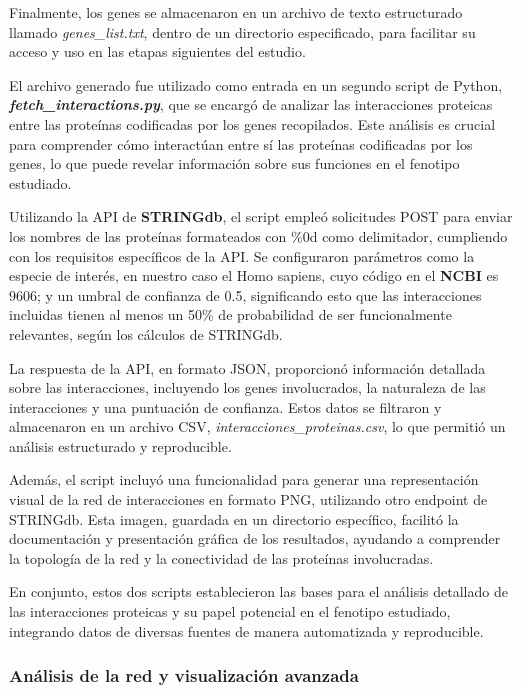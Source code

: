 Finalmente, los genes se almacenaron en un archivo de texto estructurado llamado \textit{genes\_list.txt}, dentro de un directorio especificado, para facilitar su acceso y uso en las etapas siguientes del estudio.

El archivo generado fue utilizado como entrada en un segundo script de Python, \textbf{\textit{fetch\_interactions.py}}, que se encargó de analizar las interacciones proteicas entre las proteínas codificadas por los genes recopilados. Este análisis es crucial para comprender cómo interactúan entre sí las proteínas codificadas por los genes, lo que puede revelar información sobre sus funciones en el fenotipo estudiado.

Utilizando la API de \textbf{STRINGdb}, el script empleó solicitudes POST para enviar los nombres de las proteínas formateados con \%0d como delimitador, cumpliendo con los requisitos específicos de la API. Se configuraron parámetros como la especie de interés, en nuestro caso el Homo sapiens, cuyo código en el \textbf{NCBI} es 9606; y un umbral de confianza de 0.5, significando esto que las interacciones incluidas tienen al menos un 50\% de probabilidad de ser funcionalmente relevantes, según los cálculos de STRINGdb.

La respuesta de la API, en formato JSON, proporcionó información detallada sobre las interacciones, incluyendo los genes involucrados, la naturaleza de las interacciones y una puntuación de confianza. Estos datos se filtraron y almacenaron en un archivo CSV, \textit{interacciones\_proteinas.csv}, lo que permitió un análisis estructurado y reproducible.

Además, el script incluyó una funcionalidad para generar una representación visual de la red de interacciones en formato PNG, utilizando otro endpoint de STRINGdb. Esta imagen, guardada en un directorio específico, facilitó la documentación y presentación gráfica de los resultados, ayudando a comprender la topología de la red y la conectividad de las proteínas involucradas.

En conjunto, estos dos scripts establecieron las bases para el análisis detallado de las interacciones proteicas y su papel potencial en el fenotipo estudiado, integrando datos de diversas fuentes de manera automatizada y reproducible.

\subsubsection{Análisis de la red y visualización avanzada}

